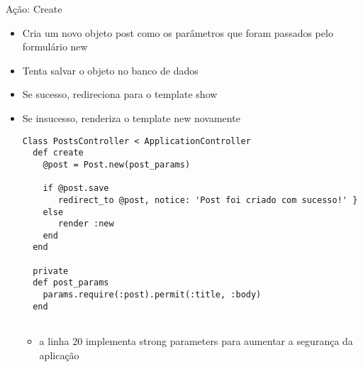 \begin{frame}{Ação: Create}
	\begin{itemize}
		\item Cria um novo objeto \alert{post} como os parâmetros que foram passados pelo 
			formulário \alert{new}
		\item Tenta \alert{salvar} o objeto no \alert{banco de dados}
		\item Se sucesso, redireciona para o template \alert{show}
		\item Se insucesso, renderiza o template \alert{new} novamente
		\begin{lstlisting}[style=RubyInputStyle, caption=controllers/posts\_controller.rb]
Class PostsController < ApplicationController
  def create
    @post = Post.new(post_params)

    if @post.save
       redirect_to @post, notice: 'Post foi criado com sucesso!' }
    else
       render :new
    end
  end
	
  private 
  def post_params 
    params.require(:post).permit(:title, :body)
  end 
				
		\end{lstlisting}		
		\begin{itemize}
			\item a linha 20 implementa \alert{strong parameters} para aumentar a segurança da aplicação
		\end{itemize}
	\end{itemize}	
\end{frame}

%				


